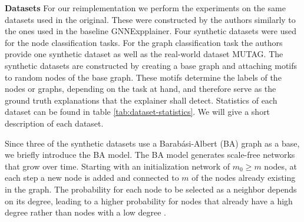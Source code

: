 \textbf{Datasets}
For our reimplementation we perform the experiments on the same datasets used in the original. These were constructed by the authors similarly to the ones used in the baseline GNNExpplainer. Four synthetic datasets were used for the node classification tasks. For the graph classification task the authors provide one synthetic dataset as well as the real-world dataset MUTAG. The synthetic datasets are constructed by creating a base graph and attaching motifs to random nodes of the base graph. These motifs determine the labels of the nodes or graphs, depending on the task at hand, and therefore serve as the ground truth explanations that the explainer shall detect. Statistics of each dataset can be found in table \ref{tab:dataset-statistics}. We will give a short description of each dataset.

Since three of the synthetic datasets use a Barabási-Albert (BA) graph as a base, we briefly introduce the BA model. The BA model generates scale-free networks that grow over time. Starting with an initialization network of $m_0 \geq m$ nodes, at each step a new node is added and connected to $m$ of the nodes already existing in the graph. The probability for each node to be selected as a neighbor depends on its degree, leading to a higher probability for nodes that already have a high degree rather than nodes with a low degree \cite{albert2002statistical}.

